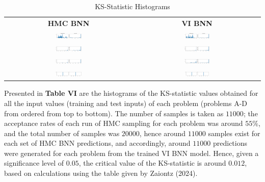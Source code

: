 \documentclass[conference]{IEEEtran}
\begin{document}
\begin{table}
\begin{tabular}{cc}
\textbf{HMC BNN} & \textbf{VI BNN}\\
\includegraphics[width=0.21\textwidth]{images/ks_test--hmc_bnn--problem_A.png} & \includegraphics[width=0.21\textwidth]{images/ks_test--vi_bnn--problem_A.png}\\ \includegraphics[width=0.21\textwidth]{images/ks_test--hmc_bnn--problem_B.png} & \includegraphics[width=0.21\textwidth]{images/ks_test--vi_bnn--problem_B.png}\\
\includegraphics[width=0.21\textwidth]{images/ks_test--hmc_bnn--problem_C.png} & \includegraphics[width=0.21\textwidth]{images/ks_test--vi_bnn--problem_C.png}\\
\includegraphics[width=0.21\textwidth]{images/ks_test--hmc_bnn--problem_D.png} & \includegraphics[width=0.2\textwidth]{images/ks_test--vi_bnn--problem_D.png}\\
\end{tabular}
\caption{KS-Statistic Histograms}
\label{tb5:table_of_figures}
\end{table}

Presented in \textbf{Table VI} are the histograms of the KS-statistic values obtained for all the input values (training and test inputs) of each problem (problems A-D from ordered from top to bottom). The number of samples is taken as $11000$; the acceptance rates of each run of HMC sampling for each problem was around $55\%$, and the total number of samples was $20000$, hence around $11000$ samples exist for each set of HMC BNN predictions, and accordingly, around $11000$ predictions were generated for each problem from the trained VI BNN model. Hence, given a significance level of $0.05$, the critical value of the KS-statistic is around $0.012$, based on calculations using the table given by Zaiontz (2024).\\
\end{document}
